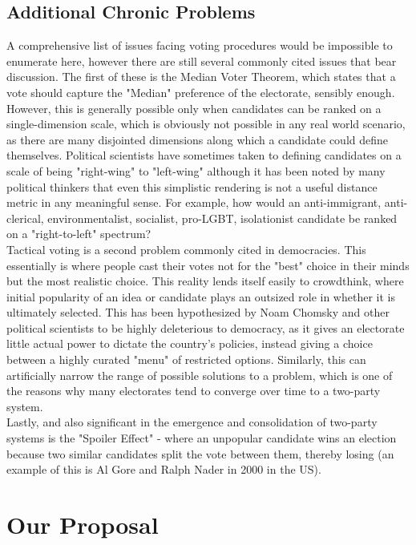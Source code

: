 \documentclass[a4paper]{article}
\begin{document}
\subsection{Additional Chronic Problems}
A comprehensive list of issues facing voting procedures would be impossible to enumerate here, however there are still several commonly cited issues that bear discussion. The first of these is the Median Voter Theorem, which states that a vote should capture the "Median" preference of the electorate, sensibly enough. However, this is generally possible only when candidates can be ranked on a single-dimension scale, which is obviously not possible in any real world scenario, as there are many disjointed dimensions along which a candidate could define themselves. Political scientists have sometimes taken to defining candidates on a scale of being "right-wing" to "left-wing" although it has been noted by many political thinkers that even this simplistic rendering is not a useful distance metric in any meaningful sense. For example, how would an anti-immigrant, anti-clerical, environmentalist, socialist, pro-LGBT, isolationist candidate be ranked on a "right-to-left" spectrum? \\
Tactical voting is a second problem commonly cited in democracies. This essentially is where people cast their votes not for the "best" choice in their minds but the most realistic choice. This reality lends itself easily to crowdthink, where initial popularity of an idea or candidate plays an outsized role in whether it is ultimately selected. This has been hypothesized by Noam Chomsky and other political scientists to be highly deleterious to democracy, as it gives an electorate little actual power to dictate the country's policies, instead giving a choice between a highly curated "menu" of restricted options. Similarly, this can artificially narrow the range of possible solutions to a problem, which is one of the reasons why many electorates tend to converge over time to a two-party system. \\
Lastly, and also significant in the emergence and consolidation of two-party systems is the "Spoiler Effect" - where an unpopular candidate wins an election because two similar candidates split the vote between them, thereby losing (an example of this is Al Gore and Ralph Nader in 2000 in the US).

\section{Our Proposal}
\end{document}
